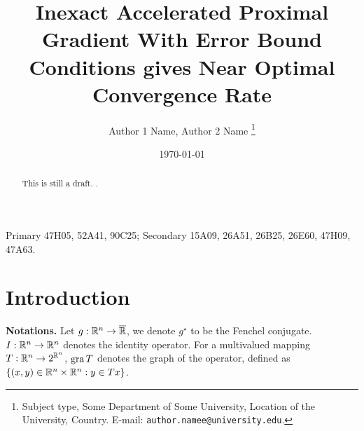 \documentclass[12pt]{article}
\title{{\fontfamily{ptm}\selectfont Inexact Accelerated Proximal Gradient With Error Bound Conditions gives Near Optimal Convergence Rate }}
\author{
    Author 1 Name, Author 2 Name
    \thanks{
        Subject type, Some Department of Some University, Location of the University,
        Country. E-mail: \texttt{author.namee@university.edu}.
    }
}
\begin{document}
\date{\today}
\maketitle
{}
\begin{abstract} 
    \noindent
    This is still a draft. \cite{zhang_robust_2022}. 
\end{abstract}
Primary 47H05, 52A41, 90C25; Secondary 15A09, 26A51, 26B25, 26E60, 47H09, 47A63.

\section{Introduction}
    \textbf{Notations.}
    Let $g: \mathbb R^n \rightarrow\overline {\mathbb R}$, we denote $g^\star$ to be the Fenchel conjugate. 
    $I: \mathbb R^n \rightarrow \mathbb R^n$ denotes the identity operator.
    For a multivalued mapping $T: \mathbb R^n \rightarrow 2^{\mathbb R^n}$, $\operatorname{gra} T$ denotes the graph of the operator, defined as $\{(x, y)\in \mathbb R^n \times \mathbb R^n : y \in Tx\}$. 
\end{document}
